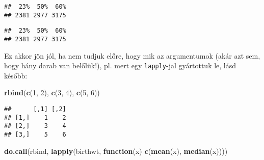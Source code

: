 \documentclass[]{book}
\newenvironment{Shaded}{\begin{snugshade}}{\end{snugshade}}
\newcommand{\KeywordTok}[1]{\textcolor[rgb]{0.13,0.29,0.53}{\textbf{#1}}}
\newcommand{\DataTypeTok}[1]{\textcolor[rgb]{0.13,0.29,0.53}{#1}}
\newcommand{\DecValTok}[1]{\textcolor[rgb]{0.00,0.00,0.81}{#1}}
\newcommand{\FloatTok}[1]{\textcolor[rgb]{0.00,0.00,0.81}{#1}}
\newcommand{\ControlFlowTok}[1]{\textcolor[rgb]{0.13,0.29,0.53}{\textbf{#1}}}
\newcommand{\OperatorTok}[1]{\textcolor[rgb]{0.81,0.36,0.00}{\textbf{#1}}}
\newcommand{\NormalTok}[1]{#1}
\begin{document}
\begin{Shaded}
\end{Shaded}

\begin{verbatim}
##  23%  50%  60% 
## 2381 2977 3175
\end{verbatim}

\begin{Shaded}
\end{Shaded}

\begin{verbatim}
##  23%  50%  60% 
## 2381 2977 3175
\end{verbatim}

Ez akkor jön jól, ha nem tudjuk előre, hogy mik az argumentumok (akár
azt sem, hogy hány darab van belőlük!), pl. mert egy \texttt{lapply}-jal
gyártottuk le, lásd később:

\begin{Shaded}
\begin{Highlighting}[]
\KeywordTok{rbind}\NormalTok{(}\KeywordTok{c}\NormalTok{(}\DecValTok{1}\NormalTok{, }\DecValTok{2}\NormalTok{), }\KeywordTok{c}\NormalTok{(}\DecValTok{3}\NormalTok{, }\DecValTok{4}\NormalTok{), }\KeywordTok{c}\NormalTok{(}\DecValTok{5}\NormalTok{, }\DecValTok{6}\NormalTok{))}
\end{Highlighting}
\end{Shaded}

\begin{verbatim}
##      [,1] [,2]
## [1,]    1    2
## [2,]    3    4
## [3,]    5    6
\end{verbatim}

\begin{Shaded}
\begin{Highlighting}[]
\KeywordTok{do.call}\NormalTok{(rbind, }\KeywordTok{lapply}\NormalTok{(birthwt, }\ControlFlowTok{function}\NormalTok{(x) }\KeywordTok{c}\NormalTok{(}\KeywordTok{mean}\NormalTok{(x), }\KeywordTok{median}\NormalTok{(x))))}
\end{Highlighting}
\end{Shaded}
\end{document}
